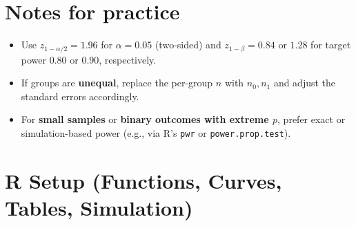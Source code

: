 \documentclass[
  letterpaper,
  DIV=11,
  numbers=noendperiod]{scrreprt}
\providecommand{\tightlist}{%
  \setlength{\itemsep}{0pt}\setlength{\parskip}{0pt}}
\begin{document}
\section{Notes for practice}\label{notes-for-practice}

\begin{itemize}
\tightlist
\item
  Use \(z_{1-\alpha/2}=1.96\) for \(\alpha=0.05\) (two-sided) and
  \(z_{1-\beta}=0.84\) or \(1.28\) for target power \(0.80\) or
  \(0.90\), respectively.
\item
  If groups are \textbf{unequal}, replace the per-group \(n\) with
  \(n_0, n_1\) and adjust the standard errors accordingly.
\item
  For \textbf{small samples} or \textbf{binary outcomes with extreme
  \(p\)}, prefer exact or simulation-based power (e.g., via R's
  \texttt{pwr} or \texttt{power.prop.test}).
\end{itemize}

\section{R Setup (Functions, Curves, Tables,
Simulation)}\label{r-setup-functions-curves-tables-simulation}
\end{document}

